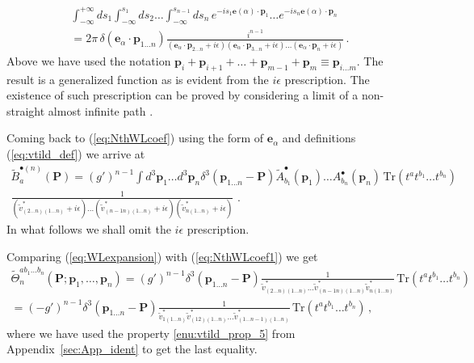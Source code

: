 \documentclass[english,american]{article}
\begin{document}
\begin{multline}
\int_{-\infty}^{+\infty}ds_{1}\int_{-\infty}^{s_{1}}ds_{2}\dots\int_{-\infty}^{s_{n-1}}ds_{n}\,
 e^{-is_{1}\mathbf{e}\left(\alpha\right)\cdot\mathbf{p}_{1}}\dots e^{-is_{n}\mathbf{e}\left(\alpha\right)\cdot\mathbf{p}_{n}}\\
=2\pi\,\delta\left(\mathbf{e}_{\alpha}\cdot\mathbf{p}_{1\dots n}\right)\frac{i^{n-1}}{\left(\mathbf{e}_{\alpha}\cdot\mathbf{p}_{2\dots n}+i\epsilon\right)\left(\mathbf{e}_{\alpha}\cdot\mathbf{p}_{3\dots n}+i\epsilon\right)\dots\left(\mathbf{e}_{\alpha}\cdot\mathbf{p}_{n}+i\epsilon\right)}\,.
\label{eq:eikonals}
\end{multline}
Above we have used the notation $\mathbf{p}_{i}+\mathbf{p}_{i+1}+\dots+\mathbf{p}_{m-1}+\mathbf{p}_{m}\equiv\mathbf{p}_{i\dots m}$.
The result is a generalized function as is evident from the $i\epsilon$
prescription. The existence of such prescription can be proved by
considering a limit of a non-straight almost infinite path \citep{Kotko2014a}. 

Coming back to (\ref{eq:NthWLcoef}) using the form of $\mathbf{e}_{\alpha}$
and definitions (\ref{eq:vtild_def}) we arrive at 
\begin{multline}
\tilde{B}_{a}^{\bullet\left(n\right)}\left(\mathbf{P}\right)=\left(g'\right)^{n-1}\int d^{3}\mathbf{p}_{1}\dots d^{3}\mathbf{p}_{n}\delta^{3}\left(\mathbf{p}_{1\dots n}-\mathbf{P}\right)\tilde{A}_{b_{1}}^{\bullet}\left(\mathbf{p}_{1}\right)\dots A_{b_{n}}^{\bullet}\left(\mathbf{p}_{n}\right)\,\mathrm{Tr}\left(t^{a}t^{b_{1}}\dots t^{b_{n}}\right)\\
\frac{1}{\left(\tilde{v}_{\left(2\dots n\right)\left(1\dots n\right)}^{*}+i\epsilon\right)\dots\left(\tilde{v}_{\left(n-1n\right)\left(1\dots n\right)}^{*}+i\epsilon\right)\left(\tilde{v}_{n\left(1\dots n\right)}^{*}+i\epsilon\right)}\,\,.\label{eq:NthWLcoef1}
\end{multline}
In what follows we shall omit the $i\epsilon$ prescription.

Comparing (\ref{eq:WLexpansion}) with (\ref{eq:NthWLcoef1}) we get
\begin{multline}
\tilde{\Theta}_{n}^{ab_{1}\dots b_{n}}\left(\mathbf{P};\mathbf{p}_{1},\dots,\mathbf{p}_{n}\right)=\left(g'\right)^{n-1}\delta^{3}\left(\mathbf{p}_{1\dots n}-\mathbf{P}\right)\frac{1}{\tilde{v}_{\left(2\dots n\right)\left(1\dots n\right)}^{*}\dots\tilde{v}_{\left(n-1n\right)\left(1\dots n\right)}^{*}\tilde{v}_{n\left(1\dots n\right)}^{*}}\,\mathrm{Tr}\left(t^{a}t^{b_{1}}\dots t^{b_{n}}\right)\\
=\left(-g'\right)^{n-1}\delta^{3}\left(\mathbf{p}_{1\dots n}-\mathbf{P}\right)\frac{1}{\tilde{v}_{1\left(1\dots n\right)}^{*}\tilde{v}_{\left(12\right)\left(1\dots n\right)}^{*}\dots\tilde{v}_{\left(1\dots n-1\right)\left(1\dots n\right)}^{*}}\,\mathrm{Tr}\left(t^{a}t^{b_{1}}\dots t^{b_{n}}\right)\,,\label{eq:Thetan}
\end{multline}
where we have used the property \eqref{enu:vtild_prop_5} from Appendix~\ref{sec:App_ident}
to get the last equality.
\end{document}
